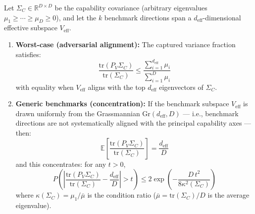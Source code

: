 

\begin{theorem}
\label{thm:deff-strengthened}
Let $\Sigma_C \in \mathbb{R}^{D \times D}$ be the capability covariance (arbitrary eigenvalues $\mu_1 \geq \cdots \geq \mu_D \geq 0$), and let the $k$ benchmark directions span a $d_{\mathrm{eff}}$-dimensional effective subspace $V_{\mathrm{eff}}$.

\begin{enumerate}[label=(\alph*)]
  \item \textbf{Worst-case (adversarial alignment):} The captured variance fraction satisfies:
  \[
    \frac{\mathrm{tr}(P_{V} \Sigma_C)}{\mathrm{tr}(\Sigma_C)} \leq \frac{\sum_{i=1}^{d_{\mathrm{eff}}} \mu_i}{\sum_{i=1}^D \mu_i}
  \]
  with equality when $V_{\mathrm{eff}}$ aligns with the top $d_{\mathrm{eff}}$ eigenvectors of $\Sigma_C$.

  \item \textbf{Generic benchmarks (concentration):} If the benchmark subspace $V_{\mathrm{eff}}$ is drawn uniformly from the Grassmannian $\mathrm{Gr}(d_{\mathrm{eff}}, D)$ --- i.e., benchmark directions are not systematically aligned with the principal capability axes --- then:
  \[
    \mathbb{E}\!\left[\frac{\mathrm{tr}(P_V \Sigma_C)}{\mathrm{tr}(\Sigma_C)}\right] = \frac{d_{\mathrm{eff}}}{D}
  \]
  and this concentrates: for any $t > 0$,
  \[
    P\!\left(\left|\frac{\mathrm{tr}(P_V \Sigma_C)}{\mathrm{tr}(\Sigma_C)} - \frac{d_{\mathrm{eff}}}{D}\right| > t\right) \leq 2\exp\!\left(-\frac{D \, t^2}{8 \kappa^2(\Sigma_C)}\right)
  \]
  where $\kappa(\Sigma_C) = \mu_1 / \bar{\mu}$ is the condition ratio ($\bar{\mu} = \mathrm{tr}(\Sigma_C)/D$ is the average eigenvalue).
\end{enumerate}
\end{theorem}

